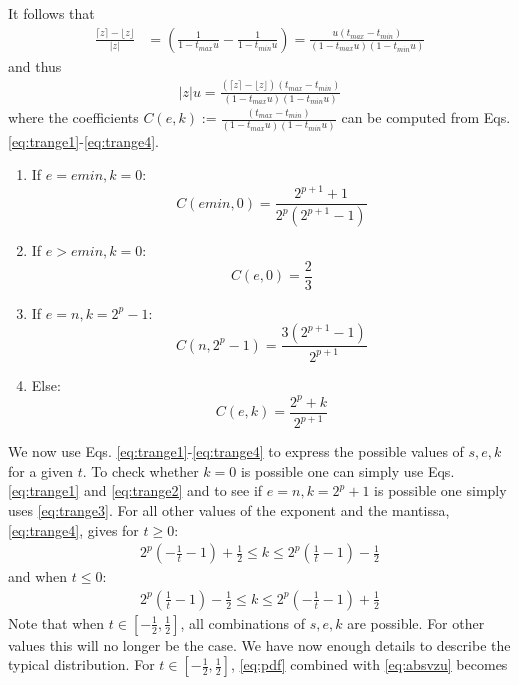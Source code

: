 \documentclass[10pt,a4paper]{article}
\theoremstyle{plain}
\theoremstyle{definition}
\newcommand{\ceil}[1]{\lceil #1 \rceil}
\newcommand{\floor}[1]{\lfloor #1 \rfloor}
\newcommand{\absv}[1]{\vert #1\vert}
\begin{document}
It follows that 
\begin{align*}
\frac{\ceil{z}-\floor{z}}{\absv{z}}&=\left(\frac{1}{1-t_{max}u}-\frac{1}{1-t_{min}u}\right)=\frac{u(t_{max}-t_{min})}{(1-t_{max}u)(1-t_{min}u)}
\end{align*}
and thus
\begin{align}
\absv{z}u=\frac{(\ceil{z}-\floor{z})(t_{max}-t_{min})}{(1-t_{max}u)(1-t_{min}u)}\label{eq:absvzu}
\end{align}
where the coefficients $C(e,k):=\frac{(t_{max}-t_{min})}{(1-t_{max}u)(1-t_{min}u)}$ can be computed from Eqs. \eqref{eq:trange1}-\eqref{eq:trange4}.
\begin{enumerate}
\item  If $e=emin, k=0$:
\[
C(emin,0)=\frac{2^{p+1}+1}{2^p(2^{p+1}-1)}
\]
\item If $e>emin, k=0$:
\[
C(e,0)=\frac{2}{3}
\]
\item  If $e=n, k=2^p-1$:
\[
C(n,2^p-1)=\frac{3(2^{p+1}-1)}{2^{p+1}}
\]
\item Else:
\[
C(e,k)=\frac{2^p+k}{2^{p+1}}
\]
\end{enumerate}


We now use Eqs. \eqref{eq:trange1}-\eqref{eq:trange4} to express the possible values of $s,e,k$ for a given $t$. To check whether $k=0$ is possible one can simply use Eqs. \eqref{eq:trange1} and \eqref{eq:trange2} and to see if $e=n, k=2^p+1$ is possible one simply uses \eqref{eq:trange3}. For all other values of the exponent and the mantissa, \eqref{eq:trange4}, gives for $t\geq 0$:
\begin{align}
2^p\left(-\frac{1}{t}-1\right)+\frac{1}{2}\leq k\leq 2^p\left(\frac{1}{t}-1\right)-\frac{1}{2}\label{eq:kfromtpos}
\end{align}
and when $t\leq 0$:
\begin{align}
2^p\left(\frac{1}{t}-1\right)-\frac{1}{2}\leq k\leq 2^p\left(-\frac{1}{t}-1\right)+\frac{1}{2}\label{eq:kfromtneg}
\end{align}
Note that when $t\in\left[-\frac{1}{2},\frac{1}{2}\right]$, all combinations of $s,e,k$ are possible. For other values this will no longer be the case.
We have now enough details to describe the typical distribution. For $t\in\left[-\frac{1}{2},\frac{1}{2}\right]$, \eqref{eq:pdf} combined with \eqref{eq:absvzu} becomes 
\end{document}
